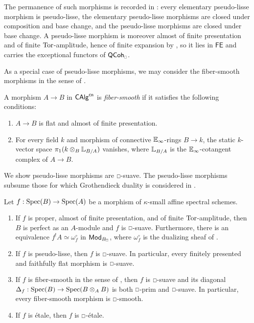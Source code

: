 \begin{remark}\label{rmk: pseudo-lisse properties recalled}
    The permanence of such morphisms is recorded in : every elementary pseudo-lisse morphism is pseudo-lisse, the elementary pseudo-lisse morphisms are closed under composition and base change, and the pseudo-lisse morphisms are closed under base change. A pseudo-lisse morphism is moreover almost of finite presentation and of finite $\mathrm{Tor}$-amplitude, hence of finite expansion by , so it lies in $\mathsf{FE}$ and carries the exceptional functors of $\QCoh_{\sld}$.
\end{remark}
As a special case of pseudo-lisse morphisms, we may consider the fiber-smooth morphisms in the sense of \cite[Def. 11.2.3.1]{SAG}. 
\begin{definition}\label{def: fiber-smooth morphism}
    A morphism $A\to B$ in $\mathsf{CAlg}^{\mathsf{cn}}$ is \emph{fiber-smooth} if it satisfies the following conditions: 
    \begin{enumerate}[label=(\roman*)]
        \item $A\to B$ is flat and almost of finite presentation. 
        \item For every field $k$ and morphism of connective $\mathbb{E}_{\infty}$-rings $B\to k$, the static $k$-vector space $\pi_{1}(k\otimes_{B}\mathbb{L}_{B/A})$ vanishes, where $\mathbb{L}_{B/A}$ is the $\mathbb{E}_{\infty}$-cotangent complex of $A\to B$. 
    \end{enumerate}
\end{definition}
We show pseudo-lisse morphisms are $\msld$-suave. The pseudo-lisse morphisms subsume those for which Grothendieck duality is considered in \cite[\S 6.4.2]{SAG}.  
\begin{proposition}\label{prop: affine suave morphisms}
    Let $f:\operatorname{Spec}(B)\to\operatorname{Spec}(A)$ be a morphism of $\kappa$-small affine spectral schemes.
    \begin{enumerate}
        \item If $f$ is proper, almost of finite presentation, and of finite $\mathrm{Tor}$-amplitude, then $B$ is perfect as an $A$-module and $f$ is $\msld$-suave. Furthermore, there is an equivalence $f^{!}A\simeq\omega_{f}^{\circ}$ in $\Mod_{B_{\sld}}$, where $\omega_{f}^{\circ}$ is the dualizing sheaf of \cite[Def. 6.4.2.4]{SAG}. 
        \item If $f$ is pseudo-lisse, then $f$ is $\msld$-suave. In particular, every finitely presented and faithfully flat morphism is $\msld$-suave.
        \item If $f$ is fiber-smooth in the sense of , then $f$ is $\msld$-suave and its diagonal $\Delta_{f}:\operatorname{Spec}(B)\to\operatorname{Spec}(B\otimes_{A}B)$ is both $\msld$-prim and $\msld$-suave. In particular, every fiber-smooth morphism is $\msld$-smooth. 
        \item If $f$ is \'{e}tale, then $f$ is $\msld$-\'{e}tale. 
    \end{enumerate}
\end{proposition}
